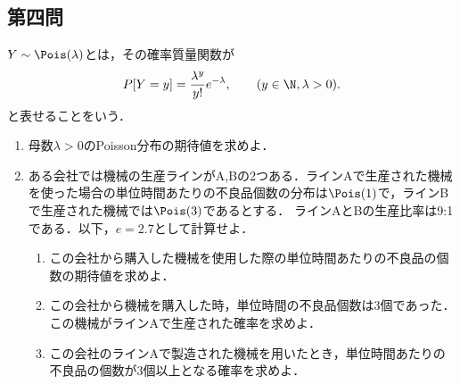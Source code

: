 \documentclass[uplatex,dvipdfmx]{jsarticle}
\begin{document}
\subsection{第四問}

\begin{tcolorbox}[colframe=ForestGreen, colback=ForestGreen!10!white,breakable,colbacktitle=ForestGreen!40!white,coltitle=black,fonttitle=\bfseries\sffamily,
    title=第４問]
    \begin{problem}\label{prob-15-8-4}
        $Y\sim\Pois(\lambda)$とは，その確率質量関数が
        \[P[Y=y]=\frac{\lambda^y}{y!}e^{-\lambda},\qquad(y\in\N,\lambda>0).\]
        と表せることをいう．
        \begin{enumerate}[{問}1]
            \item 母数$\lambda>0$のPoisson分布の期待値を求めよ．
            \item ある会社では機械の生産ラインがA,Bの2つある．ラインAで生産された機械を使った場合の単位時間あたりの不良品個数の分布は$\Pois(1)$で，ラインBで生産された機械では$\Pois(3)$であるとする．
            ラインAとBの生産比率は9:1である．以下，$e=2.7$として計算せよ．
            \begin{enumerate}
                \item この会社から購入した機械を使用した際の単位時間あたりの不良品の個数の期待値を求めよ．
                \item この会社から機械を購入した時，単位時間の不良品個数は3個であった．この機械がラインAで生産された確率を求めよ．
                \item この会社のラインAで製造された機械を用いたとき，単位時間あたりの不良品の個数が3個以上となる確率を求めよ．
            \end{enumerate}
        \end{enumerate}
    \end{problem}
\end{tcolorbox}
\end{document}
